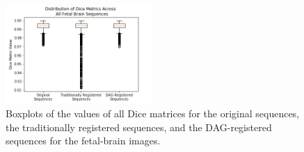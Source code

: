 \begin{figure}
\centering
\includegraphics[width=0.5\textwidth]{6/figures/fetal-brain-dice-box.png}
\caption{Boxplots of the values of all Dice matrices for the original sequences, the traditionally registered sequences, and the DAG-registered sequences for the fetal-brain images.}
\label{fig:fetal-brain-dice-box}
\end{figure}

